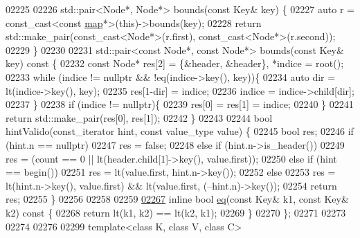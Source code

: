 \begin{DoxyCode}
02225 
02226     std::pair<Node*, Node*> bounds(\textcolor{keyword}{const} Key& key) \{
02227         \textcolor{keyword}{auto} r = \textcolor{keyword}{const\_cast<}\textcolor{keyword}{const }\hyperlink{classaed2_1_1map}{map}*\textcolor{keyword}{>}(\textcolor{keyword}{this})->bounds(key);
02228         \textcolor{keywordflow}{return} std::make\_pair(const\_cast<Node*>(r.first), const\_cast<Node*>(r.second));
02229     \}
02230 
02231     std::pair<const Node*, const Node*> bounds(\textcolor{keyword}{const} Key& key)\textcolor{keyword}{ const }\{
02232         \textcolor{keyword}{const} Node* res[2] = \{&header, &header\}, *indice = root();
02233         \textcolor{keywordflow}{while} (indice != \textcolor{keyword}{nullptr} && !eq(indice->key(), key))\{
02234             \textcolor{keyword}{auto} dir = lt(indice->key(), key);
02235             res[1-dir] = indice;
02236             indice = indice->child[dir];
02237         \}
02238         \textcolor{keywordflow}{if} (indice != \textcolor{keyword}{nullptr})\{
02239             res[0] = res[1] = indice;
02240         \}
02241         \textcolor{keywordflow}{return} std::make\_pair(res[0], res[1]);
02242     \}
02243 
02244     \textcolor{keywordtype}{bool} hintValido(const\_iterator hint, \textcolor{keyword}{const} value\_type value) \{
02245         \textcolor{keywordtype}{bool} res;
02246         \textcolor{keywordflow}{if} (hint.n == \textcolor{keyword}{nullptr})
02247             res = \textcolor{keyword}{false};
02248         \textcolor{keywordflow}{else} \textcolor{keywordflow}{if} (hint.n->is\_header())
02249             res = (count == 0 || lt(header.child[1]->key(), value.first));
02250         \textcolor{keywordflow}{else} \textcolor{keywordflow}{if} (hint == begin())
02251             res = lt(value.first, hint.n->key());
02252         \textcolor{keywordflow}{else}
02253             res = lt(hint.n->key(), value.first) && lt(value.first, (--hint.n)->key());
02254         \textcolor{keywordflow}{return} res;
02255     \}
02256 
02258 
02259 
\hyperlink{classaed2_1_1map_aebf6c09c424c39a874798165401b309e_aebf6c09c424c39a874798165401b309e}{02267}     \textcolor{keyword}{inline} \textcolor{keywordtype}{bool} \hyperlink{classaed2_1_1map_aebf6c09c424c39a874798165401b309e_aebf6c09c424c39a874798165401b309e}{eq}(\textcolor{keyword}{const} Key& k1, \textcolor{keyword}{const} Key& k2)\textcolor{keyword}{ const }\{
02268         \textcolor{keywordflow}{return} lt(k1, k2) == lt(k2, k1);
02269     \}
02270 \};
02271 
02273 
02274 
02276 
02299 \textcolor{keyword}{template}<\textcolor{keyword}{class} K, \textcolor{keyword}{class} V, \textcolor{keyword}{class} C>

\end{DoxyCode}
